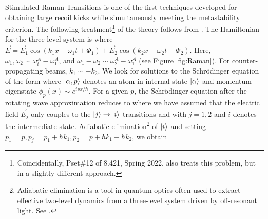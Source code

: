 \documentclass[reprint,
nofootinbib,
amsmath,amssymb,
aps]{revtex4-1}
\newcommand{\al}{\alpha}
\newcommand{\f}[2]{\frac{#1}{#2}}
\newcommand{\lb}{\left[}
\newcommand{\rb}{\right]}
\begin{document}
Stimulated Raman Transitions is one of the first techniques developed for obtaining large recoil kicks while simultaneously meeting the metastability criterion. The following treatment\footnote{Coincidentally, Pset\#12 of 8.421, Spring 2022, also treats this problem, but in a slightly different approach.} of the theory follows from \cite{kasevich1992measurement}. The Hamiltonian for the three-level system is 
where $\vec{E} = \vec{E}_1 \cos(k_1 x - \omega_1 t + \Phi_1) + \vec{E}_2 \cos(k_2 x - \omega_2 t + \Phi_2)$. Here, $\omega_1, \omega_2 \sim \omega^A_i - \omega_1^A$, and $\omega_1 - \omega_2 \sim \omega_2^A - \omega_1^A$ (see Figure \ref{fig:Raman}). For counter-propagating beams, $k_1 \sim -k_2$. We look for solutions to the Schr\"{o}dinger equation of the form 
where $\ket{\al,p}$ denotes an atom in internal state $\ket{\al}$ and momentum eigenstate $ \phi_p(x) \sim e^{ipx/\hbar}$. For a given $p$, the Schr\"{o}dinger equation after the rotating wave approximation reduces to 
where we have assumed that the electric field $\vec{E}_j$ only couples to the $\ket{j} \to \ket{i}$ transitions and 
with $j=1,2$ and $i$ denotes the intermediate state. Adiabatic elimination\footnote{Adiabatic elimination is a tool in quantum optics often used to extract effective two-level dynamics from a three-level system driven by off-resonant light. See \cite{brion2007adiabatic}. } of $\ket{i}$ and setting $p_1 = p, p_j = p_1 + \hbar k_1, p_2 = p+ \hbar k_1 - \hbar k_2$, we obtain 
\end{document}
